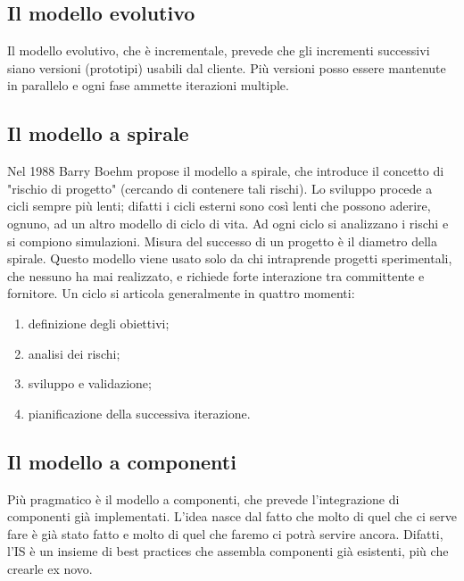 \documentclass[a4paper]{article}
\begin{document}
		
	\subsection{Il modello evolutivo}

		
Il modello evolutivo, che è incrementale, prevede che gli incrementi successivi siano versioni (prototipi) usabili dal cliente. Più versioni posso essere mantenute in parallelo e ogni fase ammette iterazioni multiple. %


		
	\subsection{Il modello a spirale}

		
Nel 1988 Barry Boehm propose il modello a spirale, che introduce il concetto di "rischio di progetto" (cercando di contenere tali rischi). Lo sviluppo procede a cicli sempre più lenti; difatti i cicli esterni sono così lenti che possono aderire, ognuno, ad un altro modello di ciclo di vita. Ad ogni ciclo si analizzano i rischi e si compiono simulazioni. Misura del successo di un progetto è il diametro della spirale. Questo modello viene usato solo da chi intraprende progetti sperimentali, che nessuno ha mai realizzato, e richiede forte interazione tra committente e fornitore. Un ciclo si articola generalmente in quattro momenti:
		
	\begin{enumerate}
		
			
	\item definizione degli obiettivi;
			
	\item analisi dei rischi;
			
	\item sviluppo e validazione;
			
	\item pianificazione della successiva iterazione.
		
	\end{enumerate}


		
	\subsection{Il modello a componenti}

		
Più pragmatico è il modello a componenti, che prevede l'integrazione di componenti già implementati. L'idea nasce dal fatto che molto di quel che ci serve fare è già stato fatto e molto di quel che faremo ci potrà servire ancora. Difatti, l'IS è un insieme di best practices che assembla componenti già esistenti, più che crearle ex novo.
\end{document}
